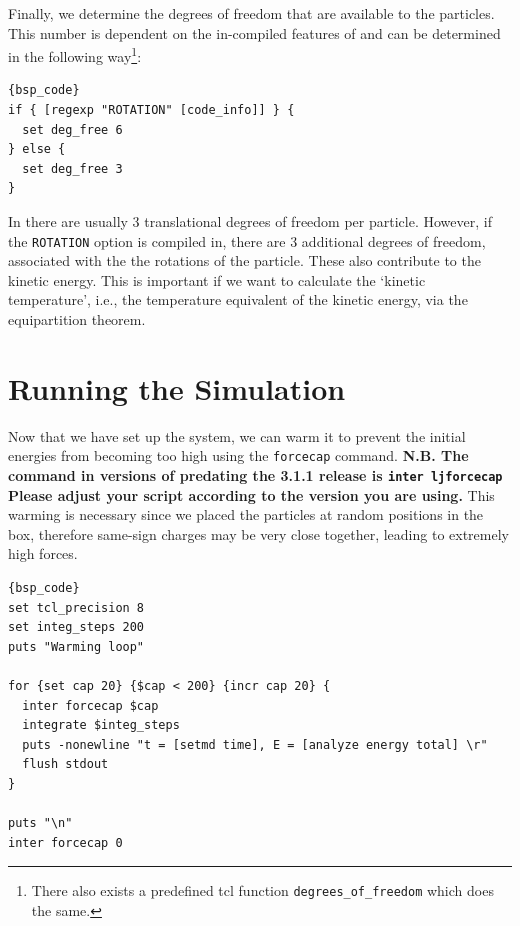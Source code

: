 \documentclass[
a4paper,                        %
11pt,                           %
twoside,                        %
footsepline,                    %
headsepline,                    %
headexclude,                    %
footexclude,                    %
pagesize,                       %
]{scrartcl}
\begin{document}
Finally, we determine the degrees of freedom that are available to the particles. This number is dependent on the in-compiled features of \es{} and can be determined in the following way\footnote{There also exists a predefined tcl function \texttt{degrees\_of\_freedom} which does the same.}: 

{\small\vspace{0,2cm}
\begin{lstlisting}[firstnumber= auto]{bsp_code}
if { [regexp "ROTATION" [code_info]] } {
  set deg_free 6
} else {
  set deg_free 3
}
\end{lstlisting}\vspace{0,2cm}
}

\noindent In \es{} there are usually 3 translational degrees of freedom per particle. However, if the \verb|ROTATION| option is compiled in, there are 3 additional degrees of freedom, associated with the the rotations of the particle. These also contribute to the kinetic energy. This is important if we want to calculate the `kinetic temperature', i.e., the temperature equivalent of the kinetic energy, via the equipartition theorem.

\section{Running the Simulation}

Now that we have set up the system, we can warm it to prevent the initial energies from becoming too high using the \verb|forcecap| command. \textbf{N.B. The command in versions of \es{} predating the 3.1.1 release is \lstinline|inter ljforcecap| Please adjust your script according to the version you are using.} This warming is necessary since we placed the particles at random positions in the box, therefore same-sign charges may be very close together, leading to extremely high forces.

{\small\vspace{0,2cm}
\begin{lstlisting}[firstnumber= auto]{bsp_code}
set tcl_precision 8
set integ_steps 200
puts "Warming loop"

for {set cap 20} {$cap < 200} {incr cap 20} {
  inter forcecap $cap
  integrate $integ_steps
  puts -nonewline "t = [setmd time], E = [analyze energy total] \r"
  flush stdout
}

puts "\n"
inter forcecap 0
\end{lstlisting}\vspace{0,2cm}
}
\end{document}
